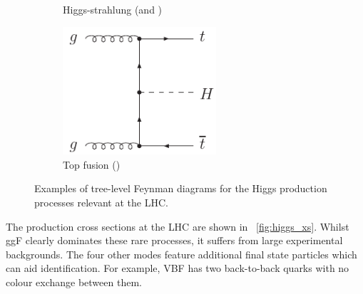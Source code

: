 \begin{figure}[b]
\begin{subfigure}[b]{0.4\textwidth}
		\caption{Higgs-strahlung (\WH and \ZH)}
		\label{fig:feyn:VH}
	\end{subfigure}
	\hfill
	\begin{subfigure}[b]{0.4\textwidth}
		\centering
		\includegraphics[width=0.625\textwidth]{axodraw/ttH.pdf}
		\caption{Top fusion (\ttH)}
		\label{fig:feyn:ttH}
	\end{subfigure}
	\hfill\null
	\caption{Examples of tree-level Feynman diagrams for the Higgs production processes relevant at the \ac{LHC}.}
	\label{fig:feyn}
\end{figure}

The production cross sections at the \acs{LHC} are shown in \Figure~\ref{fig:higgs_xs}. 
Whilst \ac{ggF} clearly dominates these rare processes, it suffers from large 
experimental backgrounds. The four other modes feature additional final state particles 
which can aid identification. For example, \ac{VBF} has two back-to-back quarks with no 
colour exchange between them.

